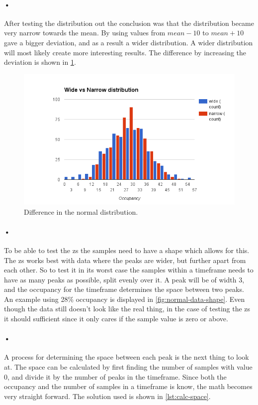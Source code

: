 \documentclass[a4paper, 12pt]{report}
\begin{document}
\paragraph{•}
After testing the distribution out the conclusion was that the distribution became very narrow towards the mean.
By using values from $mean-10$ to $mean+10$ gave a bigger deviation, and as a result a wider distribution.
A wider distribution will most likely create more interesting results.
The difference by increasing the deviation is shown in \ref{fig:distribution}.

\begin{figure}[h!]
	\centering
		\includegraphics[width=1.0\textwidth]{images/normal-dist-diff.png}
		\caption{Difference in the normal distribution.}
		\label{fig:distribution}
\end{figure}

\paragraph{•}
To be able to test the \gls{zs} the samples need to have a shape which allows for this.
The \gls{zs} works best with data where the peaks are wider, but further apart from each other.
So to test it in its worst case the samples within a timeframe needs to have as many peaks as possible, split evenly over it.
A peak will be of width 3, and the occupancy for the timeframe determines the space between two peaks.
An example using 28\% occupancy is displayed in \ref{fig:normal-data-shape}.
Even though the data still doesn't look like the real thing, in the case of testing the \gls{zs} it should sufficient since it only cares if the sample value is zero or above.

\paragraph{•}
A process for determining the space between each peak is the next thing to look at.
The space can be calculated by first finding the number of samples with value 0, and divide it by the number of peaks in the timeframe.
Since both the occupancy and the number of samples in a timeframe is know, the math becomes very straight forward.
The solution used is shown in \ref{lst:calc-space}.
\end{document}

